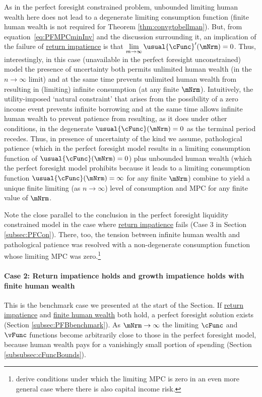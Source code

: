 \documentclass[BufferStockTheory]{subfiles}
\begin{document}
As in the perfect foresight constrained problem, unbounded limiting human wealth here does not lead to a degenerate limiting consumption function (finite human wealth is not required for Theorem \ref{thm:convgtobellman}).
But, from equation~\eqref{eq:PFMPCminInv} and the discussion surrounding it, an implication of the failure of \hyperlink{RIC}{return impatience} is that $\lim\limits_{m \rightarrow \infty} \usual{\cFunc}^{\prime}(\mNrm) = 0$.
Thus, interestingly, in this case (unavailable in the perfect foresight unconstrained) model the presence of uncertainty both permits unlimited human wealth (in the $n\rightarrow\infty$ limit) and at the same time prevents unlimited human wealth from resulting in (limiting) infinite consumption (at any finite $\mNrm$).
Intuitively, the utility-imposed `natural constraint' that arises from the possibility of a zero income event prevents infinite borrowing and at the same time allows infinite human wealth to prevent patience from resulting, as it does under other conditions, in the degenerate $\usual{\cFunc}(\mNrm)=0$ as the terminal period recedes.
Thus, in presence of uncertainty of the kind we assume, pathological patience (which in the perfect foresight model results in a limiting consumption function of $\usual{\cFunc}(\mNrm)=0$) plus unbounded human wealth (which the perfect foresight model prohibits because it leads to a limiting consumption function $\usual{\cFunc}(\mNrm)=\infty$ for any finite $\mNrm$) combine to yield a unique finite limiting (as $n \rightarrow \infty$) level of consumption and MPC for any finite value of $\mNrm$.


Note the close parallel to the conclusion in the perfect foresight liquidity constrained model in the case where \hyperlink{RIC}{return impatience} fails (Case 3 in Section \ref{subsec:PFCon}).
There, too, the tension between infinite human wealth and pathological patience was resolved with a non-degenerate consumption function whose limiting MPC was zero.\footnote{\cite{maTodaRich} derive conditions under which the limiting MPC is zero in an even more general case where there is also capital income risk.}

\hypertarget{When-the-RIC-Holds}{}
\paragraph{Case 2: Return impatience holds and growth impatience holds with finite human wealth} 
This is the benchmark case we presented at the start of the Section.
If \hyperlink{RIC}{return impatience}  and \hyperlink{FHWC}{finite human wealth} both hold, a perfect foresight solution exists (Section \ref{subsec:PFBbenchmark}).
As $\mNrm \rightarrow \infty$ the limiting $\cFunc$ and $\vFunc$ functions become arbitrarily close to those in the perfect foresight model, because human wealth pays for a vanishingly small portion of spending (Section \ref{subsubsec:cFuncBounds}).
\end{document}
